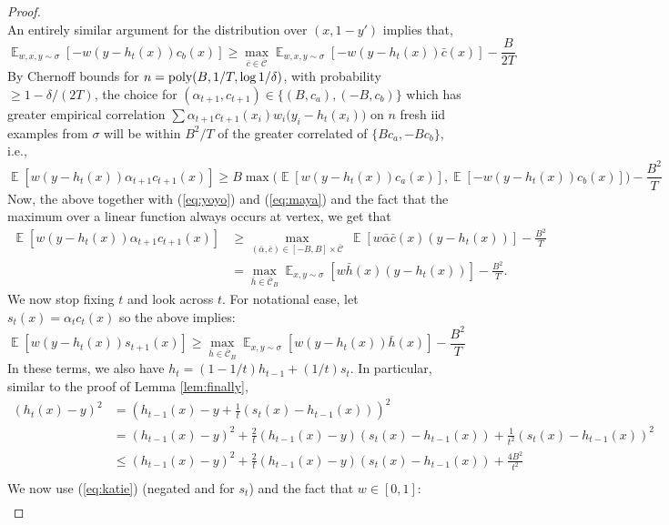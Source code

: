 \documentclass[final, 12pt]{colt2018} %
\newcommand{\E}{\mathop{\mathbb{E}}}
\def\calC{\mathcal{C}}
\newcommand{\poly}{\mathop{\mbox{\text{poly}}}}
\begin{document}
\begin{proof}
\begin{equation}
\end{equation}
An entirely similar argument for the distribution over $(x,1-y')$ implies that,
\begin{equation}\label{eq:maya}
\E_{w,x,y\sim \sigma}[-w(y-h_t(x))c_{b}(x)]\geq \max_{\bar{c} \in \bar{\calC}} \E_{w,x,y\sim \sigma}[-w(y-h_t(x))\bar{c}(x)] - \frac{B}{2T}
\end{equation}
By Chernoff bounds for $n=\poly(B,1/T,\log 1/\delta)$, with probability $\geq 1-\delta/(2T)$, the choice for $(\alpha_{t+1}, c_{t+1}) \in \{(B,c_a), (-B,c_b)\}$ which has greater empirical correlation $\sum \alpha_{t+1} c_{t+1}(x_i)w_i\bigl(y_i - h_t(x_i)\bigr)$ on $n$ fresh iid examples from $\sigma$ will be within $B^2/T$ of the greater correlated of $\{Bc_a, -Bc_b\}$, i.e.,
$$\E\left[w(y-h_t(x))\alpha_{t+1}c_{t+1}(x)\right] \geq B\max\bigl(\E[w(y-h_t(x))c_{a}(x)], \E[-w(y-h_t(x))c_{b}(x)]\bigr) - \frac{B^2}{T}$$
Now, the above together with (\ref{eq:yoyo}) and (\ref{eq:maya}) and the fact that the maximum over a linear function always occurs at vertex, we get that 
\begin{align*}
\E\left[w(y-h_t(x))\alpha_{t+1}c_{t+1}(x)\right] &\geq \max_{(\bar\alpha, \bar{c}) \in [-B, B] \times \bar{\calC}} ~\E[w\bar\alpha \bar{c}(x)(y-h_t(x))]-\frac{B^2}{T}\\
&=\max_{\bar{h}\in \bar{\calC}_B} \E_{x, y \sim \sigma}[w\bar{h}(x)(y-h_t(x))]-\frac{B^2}{T}.
\end{align*}
We now stop fixing $t$ and look across $t$.  For notational ease, let $s_t(x)=\alpha_t {c_t}(x)$ so the above implies:
\begin{equation}
\E\left[w(y-h_t(x))s_{{t+1}}(x)\right] \geq
\max_{\bar{h}\in \bar{\calC}_B}\E_{x, y \sim \sigma}[w(y-h_t(x))\bar{h}(x)]-\frac{B^2}{T}\label{eq:katie}
\end{equation}
In these terms, we also have $h_t=(1-1/t)h_{t-1} + (1/t)s_t$. In particular, similar to the proof of Lemma \ref{lem:finally},
\begin{align*}
(h_t(x)-y)^2&=\left(h_{t-1}(x)-y+\frac{1}{t}(s_t(x)-h_{t-1}(x))\right)^2\\
&=(h_{t-1}(x)-y)^2+\frac{2}{t}(h_{t-1}(x)-y)(s_t(x)-h_{t-1}(x))+\frac{1}{t^2}(s_t(x)-h_{t-1}(x))^2\\
&\leq(h_{t-1}(x)-y)^2+\frac{2}{t}(h_{t-1}(x)-y)(s_t(x)-h_{t-1}(x))+\frac{4B^2}{t^2}\\
\end{align*}
We now use (\ref{eq:katie}) (negated and for $s_t$) and the fact that $w \in [0,1]$:
\begin{align*}

\end{align*}
\end{proof}
\end{document}
